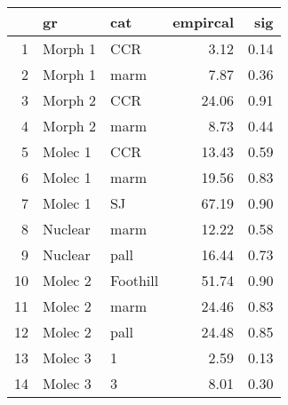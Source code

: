 \begin{table}[ht]
\centering
\begin{tabular}{rllrr}
  \hline
 & gr & cat & empircal & sig \\ 
  \hline
1 & Morph 1 & CCR & 3.12 & 0.14 \\ 
  2 & Morph 1 & marm & 7.87 & 0.36 \\ 
  3 & Morph 2 & CCR & 24.06 & 0.91 \\ 
  4 & Morph 2 & marm & 8.73 & 0.44 \\ 
  5 & Molec 1 & CCR & 13.43 & 0.59 \\ 
  6 & Molec 1 & marm & 19.56 & 0.83 \\ 
  7 & Molec 1 & SJ & 67.19 & 0.90 \\ 
  8 & Nuclear & marm & 12.22 & 0.58 \\ 
  9 & Nuclear & pall & 16.44 & 0.73 \\ 
  10 & Molec 2 & Foothill & 51.74 & 0.90 \\ 
  11 & Molec 2 & marm & 24.46 & 0.83 \\ 
  12 & Molec 2 & pall & 24.48 & 0.85 \\ 
  13 & Molec 3 & 1 & 2.59 & 0.13 \\ 
  14 & Molec 3 & 3 & 8.01 & 0.30 \\ 
   \hline
\end{tabular}
\label{mmmiss}
\end{table}
